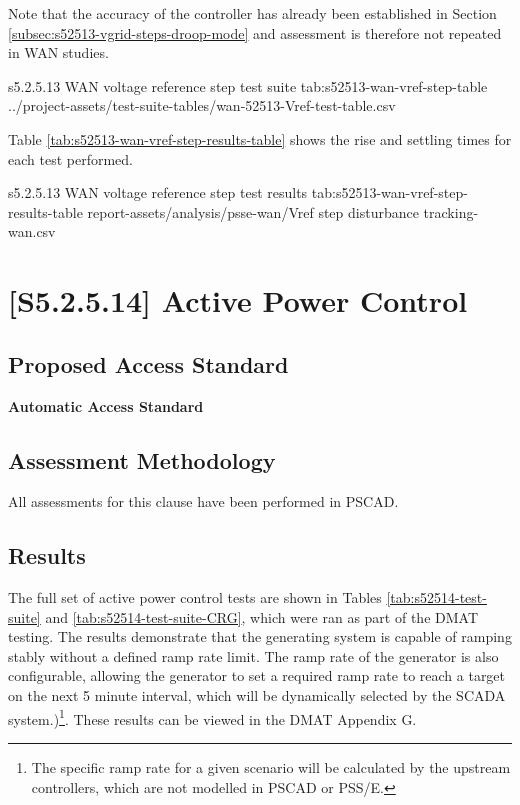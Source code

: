 \documentclass{../grid-link-report}
\newcommand{\projectassetsdir}{../project-assets}
\begin{document}
	Note that the accuracy of the controller has already been established in Section \ref{subsec:s52513-vgrid-steps-droop-mode} and assessment is therefore not repeated in \ac{WAN} studies.

	
	{
		\fontsize{9}{10}\selectfont
		\autoscaledlongtable
		{s5.2.5.13 \ac{WAN} voltage reference step test suite}
		{tab:s52513-wan-vref-step-table}
		{\projectassetsdir/test-suite-tables/wan-52513-Vref-test-table.csv}
	}
	
	Table \ref{tab:s52513-wan-vref-step-results-table} shows the rise and settling times for each test performed.
	
	{
		\fontsize{9}{10}\selectfont
		\autoscaledlongtable
		{s5.2.5.13 \ac{WAN} voltage reference step test results}
		{tab:s52513-wan-vref-step-results-table}
		{report-assets/analysis/psse-wan/Vref step disturbance tracking-wan.csv}
	}


	\section{[S5.2.5.14] Active Power Control}
	\subsection{Proposed Access Standard}
	\textbf{Automatic Access Standard}
		\begin{tcolorbox}[lightgreenbox]
			
		\end{tcolorbox}
	\subsection{Assessment Methodology}
	
	
	
	All assessments for this clause have been performed in PSCAD.

	\subsection{Results}
	
	The full set of active power control tests are shown in Tables \ref{tab:s52514-test-suite} and \ref{tab:s52514-test-suite-CRG}, which were ran as part of the DMAT testing. The results demonstrate that the generating system is capable of ramping stably without a defined ramp rate limit. The ramp rate of the generator is also configurable, allowing the generator to set a required ramp rate to reach a target on the next 5 minute interval, which will be dynamically selected by the SCADA system.)\footnote{The specific ramp rate for a given scenario will be calculated by the upstream controllers, which are not modelled in PSCAD or PSS/E.}. These results can be viewed in the DMAT Appendix G.
		
\end{document}
